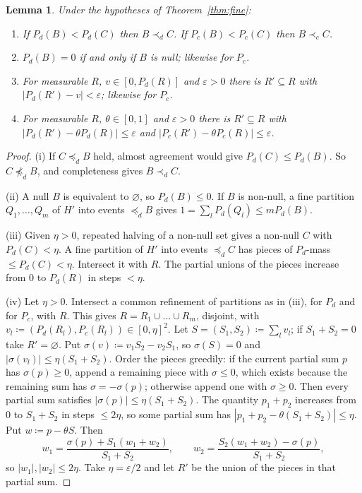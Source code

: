 \documentclass[11pt]{article}
\newtheorem{lemma}[theorem]{Lemma}
\theoremstyle{definition}\newtheorem{definition}[theorem]{Definition}
\theoremstyle{remark}\newtheorem{remark}[theorem]{Remark}
\begin{document}
\begin{lemma}\label{lem:Pd}
Under the hypotheses of Theorem~\ref{thm:fine}:
\begin{enumerate}[label=(\roman*),leftmargin=*,itemsep=1pt]
\item If $P_d(B)<P_d(C)$ then $B\prec_dC$. If $P_c(B)<P_c(C)$ then
$B\prec_cC$.
\item $P_d(B)=0$ if and only if $B$ is null; likewise for $P_c$.
\item For measurable $R$, $v\in[0,P_d(R)]$ and $\varepsilon>0$ there is
$R'\subseteq R$ with $|P_d(R')-v|<\varepsilon$; likewise for $P_c$.
\item For measurable $R$, $\theta\in[0,1]$ and $\varepsilon>0$ there is
$R'\subseteq R$ with $|P_d(R')-\theta P_d(R)|\le\varepsilon$ and
$|P_c(R')-\theta P_c(R)|\le\varepsilon$.
\end{enumerate}
\end{lemma}
\begin{proof}
(i) If $C\preceq_dB$ held, almost agreement would give $P_d(C)\le P_d(B)$.
So $C\not\preceq_dB$, and completeness gives $B\prec_dC$.

(ii) A null $B$ is equivalent to $\varnothing$, so $P_d(B)\le0$. If $B$ is
non-null, a fine partition $Q_1,\dots,Q_m$ of $H'$ into events
$\preceq_dB$ gives $1=\sum_lP_d(Q_l)\le mP_d(B)$.

(iii) Given $\eta>0$, repeated halving of a non-null set gives a non-null
$C$ with $P_d(C)<\eta$. A fine partition of $H'$ into events $\preceq_dC$ has
pieces of $P_d$-mass $\le P_d(C)<\eta$. Intersect it with $R$. The partial
unions of the pieces increase from $0$ to $P_d(R)$ in steps $<\eta$.

(iv) Let $\eta>0$. Intersect a common refinement of partitions as in (iii),
for $P_d$ and for $P_c$, with $R$. This gives $R=R_1\cup\dots\cup R_m$,
disjoint, with $v_l\coloneqq(P_d(R_l),P_c(R_l))\in[0,\eta]^2$. Let
$S=(S_1,S_2)\coloneqq\sum_lv_l$; if $S_1+S_2=0$ take $R'=\varnothing$. Put
$\sigma(v)\coloneqq v_1S_2-v_2S_1$, so $\sigma(S)=0$ and
$|\sigma(v_l)|\le\eta(S_1+S_2)$. Order the pieces greedily: if the current
partial sum $p$ has $\sigma(p)\ge0$, append a remaining piece with
$\sigma\le0$, which exists because the remaining sum has $\sigma=-\sigma(p)$;
otherwise append one with $\sigma\ge0$. Then every partial sum satisfies
$|\sigma(p)|\le\eta(S_1+S_2)$. The quantity $p_1+p_2$ increases from $0$ to
$S_1+S_2$ in steps $\le2\eta$, so some partial sum has
$|p_1+p_2-\theta(S_1+S_2)|\le\eta$. Put $w\coloneqq p-\theta S$. Then
\[
 w_1=\frac{\sigma(p)+S_1(w_1+w_2)}{S_1+S_2},\qquad
 w_2=\frac{S_2(w_1+w_2)-\sigma(p)}{S_1+S_2},
\]
so $|w_1|,|w_2|\le2\eta$. Take $\eta=\varepsilon/2$ and let $R'$ be the
union of the pieces in that partial sum.
\end{proof}
\end{document}
